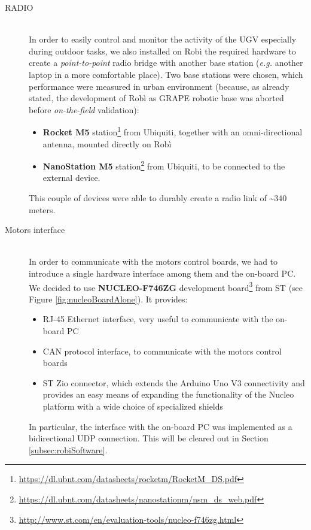 \begin{description}
	\item[RADIO] \hfill \\ In order to easily control and monitor the activity of the \ac{UGV} especially during outdoor tasks, we also installed on Robì the required hardware to create a \textit{point-to-point} radio bridge with another base station (\textit{e.g.} another laptop in a more comfortable place). Two base stations were chosen, which performance were measured in urban environment (because, as already stated, the development of Robì as \ac{GRAPE} robotic base was aborted before \textit{on-the-field} validation):
	\begin{itemize}
		\item \textbf{Rocket M5} station\footnote{\url{https://dl.ubnt.com/datasheets/rocketm/RocketM_DS.pdf}}
		from Ubiquiti, together with an omni-directional antenna, mounted directly on Robì
		\item \textbf{NanoStation M5} station\footnote{\url{https://dl.ubnt.com/datasheets/nanostationm/nsm_ds_web.pdf}}
		from Ubiquiti, to be connected to the external device.
	\end{itemize}
	This couple of devices were able to durably create a radio link of \textasciitilde340 meters.
	
	\item[Motors interface] \hfill \\ In order to communicate with the motors control boards, we had to introduce a single hardware interface among them and the on-board PC. We decided to use \textbf{NUCLEO-F746ZG} development board\footnote{\url{http://www.st.com/en/evaluation-tools/nucleo-f746zg.html}}
	from ST (see Figure \ref{fig:nucleoBoardAlone}). It provides:
	\begin{itemize}
		\item RJ-45 Ethernet interface, very useful to communicate with the on-board PC
		\item CAN protocol interface, to communicate with the motors control boards
		\item ST Zio connector, which extends the Arduino Uno V3 connectivity and provides an easy means of expanding the functionality of the Nucleo platform with a wide choice of specialized shields
	\end{itemize}
	In particular, the interface with the on-board PC was implemented as a bidirectional UDP connection. This will be cleared out in Section \ref{subsec:robiSoftware}.
	

\end{description}
